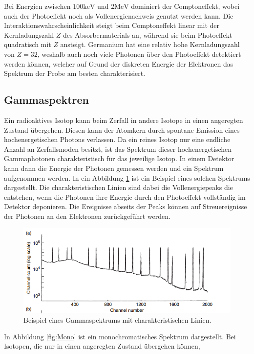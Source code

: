 \noindent Bei Energien zwischen $100\si{\kilo\electronvolt}$ und $2\si{\mega\electronvolt}$ dominiert der Comptoneffekt, wobei auch der Photoeffekt noch als Vollenergienachweis genutzt werden kann.
Die Interaktionswahrscheinlichkeit steigt beim Comptoneffekt linear mit der Kernladungszahl $Z$ des Absorbermaterials an, während sie beim Photoeffekt quadratisch mit $Z$ ansteigt.
Germanium hat eine relativ hohe Kernladungszahl von $Z=32$, weshalb auch noch viele Photonen über den Photoeffekt detektiert werden können, welcher auf Grund der diskreten 
Energie der Elektronen das Spektrum der Probe am besten charakterisiert. 
\subsection{Gammaspektren}
Ein radioaktives Isotop kann beim Zerfall in andere Isotope in einen angeregten Zustand übergehen. Diesen kann der Atomkern durch spontane Emission eines 
hochenergetischen Photons verlassen. Da ein reines Isotop nur eine endliche Anzahl an Zerfallsmoden besitzt, ist das Spektrum dieser hochenergetischen 
Gammaphotonen charakteristisch für das jeweilige Isotop. In einem Detektor kann dann die Energie der Photonen gemessen werden und ein Spektrum aufgenommen werden.
In ein Abbildung \ref{fig:Spektrum} ist ein Beispiel eines solchen Spektrums dargestellt. Die charakteristischen Linien sind dabei die Vollenergiepeaks die 
entstehen, wenn die Photonen ihre Energie durch den Photoeffekt vollständig im Detektor deponieren. Die Ereignisse abseits der Peaks können 
auf Streuereignisse der Photonen an den Elektronen zurückgeführt werden.
\begin{figure}[H]
    \centering
    \includegraphics[scale=1.0]{illustration/LinienSpektrum.png}
    \caption{Beispiel eines Gammaspektrums mit charakteristischen Linien.\cite{GammaRay}}
    \label{fig:Spektrum}
\end{figure}
In Abbildung \ref{fig:Mono} ist ein monochromatisches Spektrum dargestellt. Bei Isotopen, die nur in einen angeregten Zustand übergehen können,
